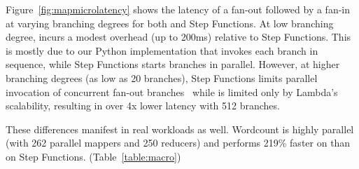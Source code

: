 Figure~\ref{fig:mapmicrolatency} shows the latency of a fan-out followed by a
fan-in at varying branching degrees for both \name{} and Step Functions. At
low branching degree, \name{} incurs a modest overhead (up to 200ms) relative
to Step Functions. This is mostly due to our Python implementation that
invokes each branch in sequence, while Step Functions starts branches in
parallel. However, at higher branching degrees (as low as 20 branches), Step
Functions limits parallel invocation of concurrent fan-out
branches~\cite{aws-step-functions-map-state} while \name{} is limited only by
Lambda's scalability, resulting in over 4x lower latency with 512 branches.

These differences manifest in real workloads as well. Wordcount is highly
parallel (with 262 parallel mappers and 250 reducers) and performs 219\%
faster on \name{} than on Step Functions. (Table~\ref{table:macro})






